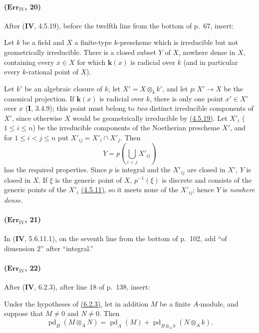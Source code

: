 \paragraph{($\mathbf{Err}_{\mathrm{IV}}$, 20)}
After (\textbf{IV}, 4.5.19), before the twelfth line from the bottom of p.~67,
insert:

\begin{corollary}[4.5.19.3]
\label{IV.4.5.19.3}
Let $k$ be a field and $X$ a finite-type $k$-prescheme which is
irreducible but not geometrically irreducible.  There is a closed subset
$Y$ of $X$, nowhere dense in $X$, containing every $x\in X$ for which
$\boldsymbol{k}(x)$ is radicial over $k$ (and in particular every $k$-rational point
of $X$).
\end{corollary}

Let $k'$ be an algebraic closure of $k$, let $X'=X\otimes_kk'$, and let
$p:X'\to X$ be the canonical projection.  If $\boldsymbol{k}(x)$ is radicial over
$k$, there is only one point $x'\in X'$ over $x$ (\textbf{I}, 3.4.9); this point
must belong to \emph{two} distinct irreducible components of $X'$, since
otherwise $X$ would be geometrically irreducible by {\hyperref[IV.4.5.19]{(4.5.19)}}.  Let
$X'_i$ ($1\leq i\leq n$) be the irreducible components of the Noetherian
prescheme $X'$, and for $1\leq i<j\leq n$ put
$X'_{ij}=X'_i\cap X'_j$.  Then
\[
 Y=p\left(\bigcup_{i<j}X'_{ij}\right)
\]
has the required properties.  Since $p$ is integral and the $X'_{ij}$
are closed in $X'$, $Y$ is closed in $X$.  If $\xi$ is the generic point
of $X$, $p^{-1}(\xi)$ is discrete and consists of the generic points of
the $X'_i$ {\hyperref[IV.4.5.11]{(4.5.11)}}, so it meets none of the $X'_{ij}$; hence $Y$ is
\emph{nowhere dense}.

\paragraph{($\mathbf{Err}_{\mathrm{IV}}$, 21)}
In (\textbf{IV}, 5.6.11.1), on the seventh line from the bottom of p.~102, add
``of dimension $2$'' after ``integral.''

\paragraph{($\mathbf{Err}_{\mathrm{IV}}$, 22)}
After (\textbf{IV}, 6.2.3), after line 18 of p.~138, insert:

\begin{proposition}[6.2.4]
\label{IV.6.2.4}
Under the hypotheses of \textup{\hyperref[IV.6.2.3]{(6.2.3)}}, let in addition $M$ be a finite
$A$-module, and suppose that $M\neq0$ and $N\neq0$.  Then
\begin{equation}
 \operatorname{pd}_B(M\otimes_AN)=
 \operatorname{pd}_A(M)+
 \operatorname{pd}_{B\otimes_Ak}(N\otimes_Ak). \label{IV.6.2.4.1}
\tag{6.2.4.1}
\end{equation}
\end{proposition}

